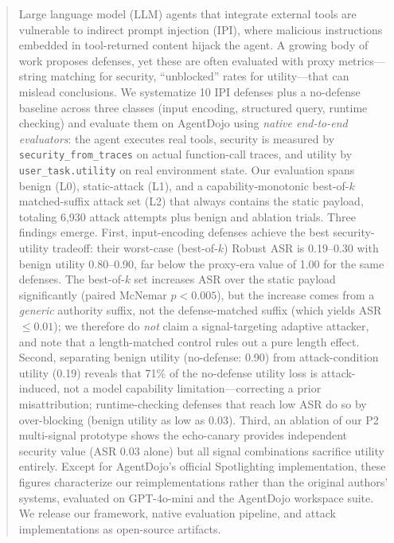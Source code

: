 \begin{abstract}
Large language model (LLM) agents that integrate external tools are vulnerable to indirect prompt injection (IPI), where malicious instructions embedded in tool-returned content hijack the agent. A growing body of work proposes defenses, yet these are often evaluated with proxy metrics---string matching for security, ``unblocked'' rates for utility---that can mislead conclusions. We systematize 10 IPI defenses plus a no-defense baseline across three classes (input encoding, structured query, runtime checking) and evaluate them on AgentDojo using \emph{native end-to-end evaluators}: the agent executes real tools, security is measured by \texttt{security\_from\_traces} on actual function-call traces, and utility by \texttt{user\_task.utility} on real environment state. Our evaluation spans benign (L0), static-attack (L1), and a capability-monotonic best-of-$k$ matched-suffix attack set (L2) that always contains the static payload, totaling 6{,}930 attack attempts plus benign and ablation trials. Three findings emerge. First, input-encoding defenses achieve the best security-utility tradeoff: their worst-case (best-of-$k$) Robust ASR is 0.19--0.30 with benign utility 0.80--0.90, far below the proxy-era value of 1.00 for the same defenses. The best-of-$k$ set increases ASR over the static payload significantly (paired McNemar $p<0.005$), but the increase comes from a \emph{generic} authority suffix, not the defense-matched suffix (which yields ASR $\leq 0.01$); we therefore do \emph{not} claim a signal-targeting adaptive attacker, and note that a length-matched control rules out a pure length effect. Second, separating benign utility (no-defense: 0.90) from attack-condition utility (0.19) reveals that 71\% of the no-defense utility loss is attack-induced, not a model capability limitation---correcting a prior misattribution; runtime-checking defenses that reach low ASR do so by over-blocking (benign utility as low as 0.03). Third, an ablation of our P2 multi-signal prototype shows the echo-canary provides independent security value (ASR 0.03 alone) but all signal combinations sacrifice utility entirely. Except for AgentDojo's official Spotlighting implementation, these figures characterize our reimplementations rather than the original authors' systems, evaluated on GPT-4o-mini and the AgentDojo workspace suite. We release our framework, native evaluation pipeline, and attack implementations as open-source artifacts.
\end{abstract}
